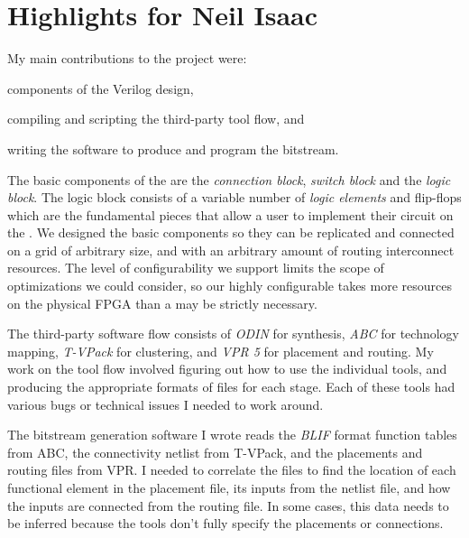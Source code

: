\section*{Highlights for Neil Isaac}

My main contributions to the project were:
\begin{itemlist}
	\item components of the \overlay Verilog design,
	\item compiling and scripting the third-party tool flow, and
	\item writing the software to produce and program the bitstream.
\end{itemlist}

The basic components of the \overlay are the \emph{connection block}, \emph{switch block} and the \emph{logic block}.
The logic block consists of a variable number of \emph{logic elements} and flip-flops which are the fundamental pieces that allow a user to implement their circuit on the \overlay.
We designed the basic components so they can be replicated and connected on a grid of arbitrary size, and with an arbitrary amount of routing interconnect resources.
The level of configurability we support limits the scope of optimizations we could consider, so our highly configurable \overlay takes more resources on the physical FPGA than a may be strictly necessary.

The third-party software flow consists of \emph{ODIN} for synthesis, \emph{ABC} for technology mapping, \emph{T-VPack} for clustering, and \emph{VPR 5} for placement and routing.
My work on the tool flow involved figuring out how to use the individual tools, and producing the appropriate formats of files for each stage.
Each of these tools had various bugs or technical issues I needed to work around.

The bitstream generation software I wrote reads the \emph{BLIF} format function tables from ABC, the connectivity netlist from T-VPack, and the placements and routing files from VPR.
I needed to correlate the files to find the location of each functional element in the placement file, its inputs from the netlist file, and how the inputs are connected from the routing file.
In some cases, this data needs to be inferred because the tools don't fully specify the placements or connections.


